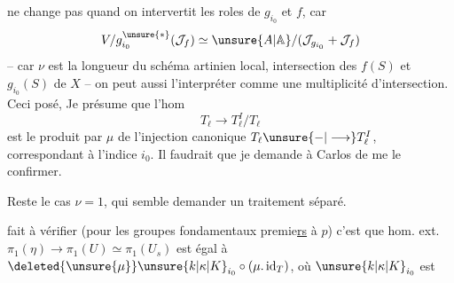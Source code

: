 ne change pas quand on intervertit les roles de $g_{i_0}$ et $f$, car
\[
V/g_{i_0}^{\unsure{*}}(\mathcal J_f)\simeq\unsure{A|\mathbb A}/(\mathcal J_{g_{i_0}}+\mathcal J_f)
\]
-- car $\nu$ est la longueur du schéma artinien local, intersection des  $f(S)$ et $g_{i_0}(S)$ de $X$ -- on peut aussi l'interpréter comme une multiplicité d'intersection. Ceci posé, Je présume que l'hom
\[
T_\ell\longrightarrow T_\ell^I/T_\ell
\]
est le produit par $\mu$ de l'injection canonique $T_\ell\unsure{-|\longrightarrow}T_\ell^I$, correspondant à l'indice $i_0$. Il faudrait que je demande à Carlos de me le confirmer.

Reste le cas $\nu=1$, qui semble demander un traitement séparé.

 fait à vérifier (pour les groupes fondamentaux premie\uline{rs} à $p$) c'est que  hom. ext. $\pi_1(\eta)\longrightarrow\pi_1(U)\simeq\pi_1(U_s)$ est égal à $\deleted{\unsure{\mu}}\unsure{k|\kappa|K}_{i_0}\circ(\mu.\operatorname{id}_T)$, où $\unsure{k|\kappa|K}_{i_0}$ est
